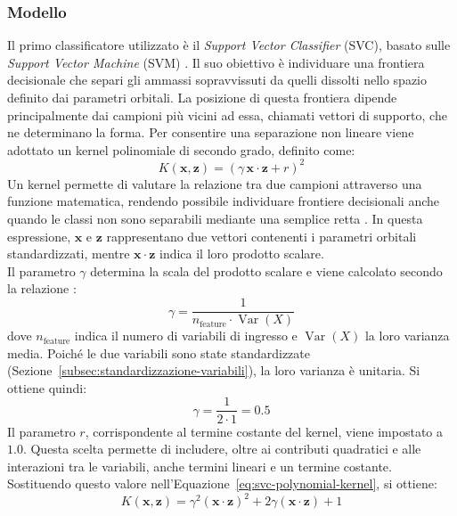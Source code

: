 \subsubsection{Modello}
Il primo classificatore utilizzato è il \emph{Support Vector Classifier} (SVC), basato sulle \emph{Support Vector Machine} (SVM) \cite{cortes1995support}. Il suo obiettivo è individuare una frontiera decisionale che separi gli ammassi sopravvissuti da quelli dissolti nello spazio definito dai parametri orbitali. La posizione di questa frontiera dipende principalmente dai campioni più vicini ad essa, chiamati vettori di supporto, che ne determinano la forma.
Per consentire una separazione non lineare viene adottato un kernel polinomiale di secondo grado, definito come:
\begin{equation}
	K(\mathbf{x},\mathbf{z})=(\gamma\,\mathbf{x}\cdot\mathbf{z}+r)^2
	\label{eq:svc-polynomial-kernel}
\end{equation}
Un kernel permette di valutare la relazione tra due campioni attraverso una funzione matematica, rendendo possibile individuare frontiere decisionali anche quando le classi non sono separabili mediante una semplice retta \cite{scholkopf2002learning}. In questa espressione, $\mathbf{x}$ e $\mathbf{z}$ rappresentano due vettori contenenti i parametri orbitali standardizzati, mentre $\mathbf{x}\cdot\mathbf{z}$ indica il loro prodotto scalare.\\
Il parametro $\gamma$ determina la scala del prodotto scalare e viene calcolato secondo la relazione \cite{scikitlearnsvmdoc}:
\begin{equation}
	\gamma = \frac{1}{n_{\mathrm{feature}}\cdot\operatorname{Var}(X)}
	\label{eq:svc-gamma}
\end{equation}
dove $n_{\mathrm{feature}}$ indica il numero di variabili di ingresso e $\operatorname{Var}(X)$ la loro varianza media. Poiché le due variabili sono state standardizzate (Sezione~\ref{subsec:standardizzazione-variabili}), la loro varianza è unitaria. Si ottiene quindi:
\[
\gamma = \frac{1}{2\cdot 1}=0.5
\]
Il parametro $r$, corrispondente al termine costante del kernel, viene impostato a $1.0$. Questa scelta permette di includere, oltre ai contributi quadratici e alle interazioni tra le variabili, anche termini lineari e un termine costante. Sostituendo questo valore nell'Equazione~\ref{eq:svc-polynomial-kernel}, si ottiene:
\begin{equation}
	K(\mathbf{x},\mathbf{z}) =
	\gamma^2(\mathbf{x}\cdot\mathbf{z})^2
	+2\gamma(\mathbf{x}\cdot\mathbf{z})+1
	\label{eq:svc-polynomial-kernel-expanded}
\end{equation}
